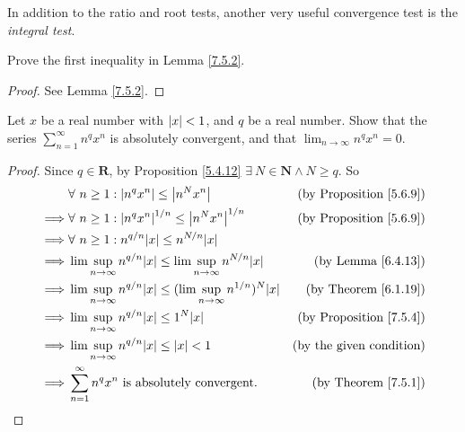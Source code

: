 \begin{remark}\label{7.5.5}
In addition to the ratio and root tests, another very useful convergence test is the \emph{integral test}.
\end{remark}

\exercisesection

\begin{exercise}\label{ex 7.5.1}
Prove the first inequality in Lemma \ref{7.5.2}.
\end{exercise}

\begin{proof}
See Lemma \ref{7.5.2}.
\end{proof}

\begin{exercise}\label{ex 7.5.2}
Let \(x\) be a real number with \(\abs*{x} < 1\), and \(q\) be a real number.
Show that the series \(\sum_{n = 1}^\infty n^q x^n\) is absolutely convergent, and that \(\lim_{n \to \infty} n^q x^n = 0\).
\end{exercise}

\begin{proof}
Since \(q \in \mathbf{R}\), by Proposition \ref{5.4.12} \(\exists\ N \in \mathbf{N} \land N \geq q\).
So
\begin{align*}
& \forall\ n \geq 1 : \abs*{n^q x^n} \leq \abs*{n^N x^n} & \text{(by Proposition \ref{5.6.9})} \\
\implies & \forall\ n \geq 1 : \abs*{n^q x^n}^{1 / n} \leq \abs*{n^N x^n}^{1 / n} & \text{(by Proposition \ref{5.6.9})} \\
\implies & \forall\ n \geq 1 : n^{q / n} \abs*{x} \leq n^{N / n} \abs*{x} \\
\implies & \lim\sup_{n \to \infty} n^{q / n} \abs*{x} \leq \lim\sup_{n \to \infty} n^{N / n} \abs*{x} & \text{(by Lemma \ref{6.4.13})} \\
\implies & \lim\sup_{n \to \infty} n^{q / n} \abs*{x} \leq (\lim\sup_{n \to \infty} n^{1 / n})^N \abs*{x} & \text{(by Theorem \ref{6.1.19})} \\
\implies & \lim\sup_{n \to \infty} n^{q / n} \abs*{x} \leq 1^N \abs*{x} & \text{(by Proposition \ref{7.5.4})} \\
\implies & \lim\sup_{n \to \infty} n^{q / n} \abs*{x} \leq \abs*{x} < 1 & \text{(by the given condition)} \\
\implies & \sum_{n = 1}^\infty n^q x^n \text{ is absolutely convergent}. & \text{(by Theorem \ref{7.5.1})}
\end{align*}
\end{proof}

